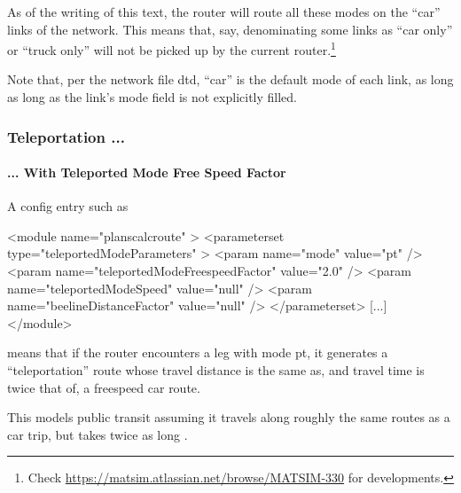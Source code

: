 As of the writing of this text, the router will route all these modes 
on the ``car'' links of the network.  This means that, say, denominating some links as ``car only'' or ``truck only'' will not be picked up by the current router.\footnote{%
%
Check \url{https://matsim.atlassian.net/browse/MATSIM-330} for developments.
%
}

Note that, per the network file \gls{dtd}, ``car'' is the default mode of each link, as long as long as the link's mode field is not explicitly filled. 




\subsubsection{Teleportation ...}
\label{sec:teleportation-routing}

\paragraph{... With Teleported Mode Free Speed Factor}
A config entry such as
\begin{xml}
<module name="planscalcroute" >
   <parameterset type="teleportedModeParameters" >
      <param name="mode" value="pt" />
      <param name="teleportedModeFreespeedFactor" value="2.0" />
      <param name="teleportedModeSpeed" value="null" />
      <param name="beelineDistanceFactor" value="null" />
   </parameterset>
   [...]   
</module>      
\end{xml}
means that if the router encounters a leg with mode pt, it generates a ``teleportation'' route whose travel distance is the same as, and  travel time is twice that of, a freespeed car route.

This models public transit assuming it travels along roughly the same routes as a car trip, but takes twice as long \citep[\cf][]{Reinhold2006Konzeptzurintegrierten}.

